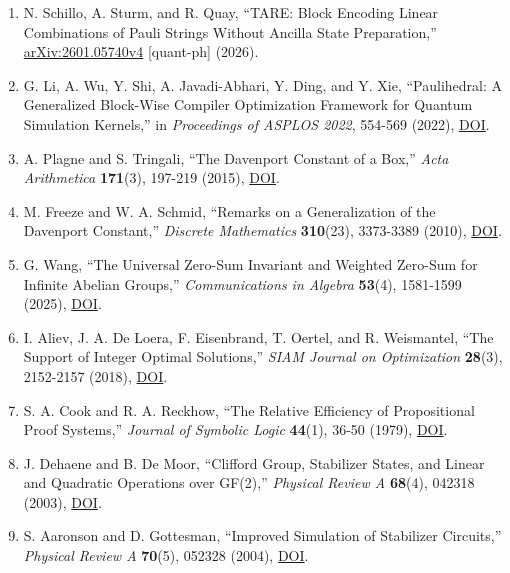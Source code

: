 \documentclass[11pt]{article}
\providecommand{\tightlist}{\setlength{\itemsep}{0pt}\setlength{\parskip}{0pt}}
\begin{document}
\begin{enumerate}
\def\labelenumi{\arabic{enumi}.}
\tightlist
\item
  N. Schillo, A. Sturm, and R. Quay, ``TARE: Block Encoding Linear Combinations of Pauli Strings Without Ancilla State Preparation,'' \href{https://arxiv.org/abs/2601.05740v4}{arXiv:2601.05740v4} {[}quant-ph{]} (2026).
\item
  G. Li, A. Wu, Y. Shi, A. Javadi-Abhari, Y. Ding, and Y. Xie, ``Paulihedral: A Generalized Block-Wise Compiler Optimization Framework for Quantum Simulation Kernels,'' in \emph{Proceedings of ASPLOS 2022}, 554-569 (2022), \href{https://doi.org/10.1145/3503222.3507715}{DOI}.
\item
  A. Plagne and S. Tringali, ``The Davenport Constant of a Box,'' \emph{Acta Arithmetica} \textbf{171}(3), 197-219 (2015), \href{https://doi.org/10.4064/aa171-3-1}{DOI}.
\item
  M. Freeze and W. A. Schmid, ``Remarks on a Generalization of the Davenport Constant,'' \emph{Discrete Mathematics} \textbf{310}(23), 3373-3389 (2010), \href{https://doi.org/10.1016/j.disc.2010.07.028}{DOI}.
\item
  G. Wang, ``The Universal Zero-Sum Invariant and Weighted Zero-Sum for Infinite Abelian Groups,'' \emph{Communications in Algebra} \textbf{53}(4), 1581-1599 (2025), \href{https://doi.org/10.1080/00927872.2024.2418017}{DOI}.
\item
  I. Aliev, J. A. De Loera, F. Eisenbrand, T. Oertel, and R. Weismantel, ``The Support of Integer Optimal Solutions,'' \emph{SIAM Journal on Optimization} \textbf{28}(3), 2152-2157 (2018), \href{https://doi.org/10.1137/17M1162792}{DOI}.
\item
  S. A. Cook and R. A. Reckhow, ``The Relative Efficiency of Propositional Proof Systems,'' \emph{Journal of Symbolic Logic} \textbf{44}(1), 36-50 (1979), \href{https://doi.org/10.2307/2273702}{DOI}.
\item
  J. Dehaene and B. De Moor, ``Clifford Group, Stabilizer States, and Linear and Quadratic Operations over GF(2),'' \emph{Physical Review A} \textbf{68}(4), 042318 (2003), \href{https://doi.org/10.1103/PhysRevA.68.042318}{DOI}.
\item
  S. Aaronson and D. Gottesman, ``Improved Simulation of Stabilizer Circuits,'' \emph{Physical Review A} \textbf{70}(5), 052328 (2004), \href{https://doi.org/10.1103/PhysRevA.70.052328}{DOI}.
\end{enumerate}
\end{document}

